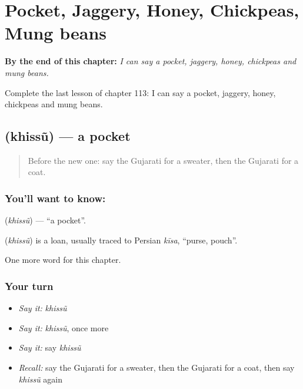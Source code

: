 
\chapter{Pocket, Jaggery, Honey, Chickpeas, Mung beans}
\label{ch:gu-pocket-jaggery-honey-chickpeas-mung-beans}

\begin{chapteropening}
\textbf{By the end of this chapter:} \emph{I can say a pocket, jaggery, honey, chickpeas and mung beans.}

Complete the last lesson of chapter 113: I can say a pocket, jaggery, honey, chickpeas and mung beans.
\end{chapteropening}

\section[\texorpdfstring{\gu{ખિસ્સું} (khissũ)}{ખિસ્સું (khissũ)}]{ (khissũ) — a pocket}

\label{lesson:GU-C113-khissu}



\begin{quote}
Before the new one: say the Gujarati for a sweater, then the Gujarati for a coat.
\end{quote}

\subsection*{You'll want to know: }
\textbf{} (\emph{khissũ}) — \textquotedblleft{}a pocket\textquotedblright{}.

\begin{cousinweb}
\textbf{} (\emph{khissũ}) is a loan, usually traced to Persian \emph{kīsa}, \textquotedblleft{}purse, pouch\textquotedblright{}.
\end{cousinweb}

\begin{grammarlens}[title={What you've built}]
One more word for this chapter.
\end{grammarlens}

\subsection*{Your turn}
\begin{itemize}
\raggedright
  \item \emph{Say it:} \emph{khissũ}
  \item \emph{Say it:} \emph{khissũ}, once more
  \item \emph{Say it:} say \emph{khissũ}
  \item \emph{Recall:} say the Gujarati for a sweater, then the Gujarati for a coat, then say \emph{khissũ} again
\end{itemize}

